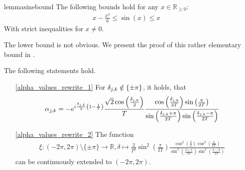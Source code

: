 \begin{restatable}{lemma}{sinebound} \label{sine_bound}
    The following bounds hold for any \(x \in \mathbb{R}_{\geq 0}\):
    \begin{align}
        x - \frac{x^3}{6} \leq \sin(x) \leq x
    \end{align}
    With strict inequalities for \(x \neq 0\).
\end{restatable}

The lower bound is not obvious. We present the proof of this rather elementary bound in .

\begin{lemma} \label{alpha_values_rewrite}
    The following statements hold.
    \begin{enumerate}[label=(\roman*)]
        \item[\ref{alpha_values_rewrite_1}] For \(\delta_{j, k} \notin \{\pm \pi\}\), it holds, that
        \begin{align}
            \alpha_{j, k} = -e^{i\frac{\delta_{j, k}}{2}\left(1-\frac{1}{T}\right)}\frac{\sqrt{2}\cos\left(\frac{\delta_{j, k}}{2}\right)}{T} \frac{\cos\left(\frac{\delta_{j, k}}{2T}\right)\sin\left(\frac{\pi}{2T}\right)}{\sin\left(\frac{\delta_{j, k}+\pi}{2T}\right)\sin\left(\frac{\delta_{j, k}-\pi}{2T}\right)}
        \end{align}
        \item[\ref{alpha_values_rewrite_2}] The function
        \begin{align}
            \xi \colon (-2\pi, 2\pi) \setminus \{\pm \pi\} \to \mathbb{R}, \delta \mapsto \frac{2}{T^2} \sin^2\left(\frac{\pi}{2T}\right) \frac{\cos^2\left(\frac{\delta}{2}\right)\cos^2\left(\frac{\delta}{2T}\right)}{\sin^2\left(\frac{\delta+\pi}{2T}\right)\sin^2\left(\frac{\delta-\pi}{2T}\right)}
        \end{align}
        can be continuously extended to \((-2\pi, 2\pi)\).
    \end{enumerate}
\end{lemma}

